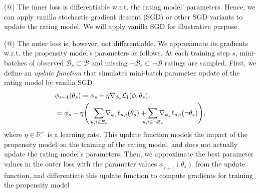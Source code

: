 \documentclass[letterpaper]{article} %
\makeatletter
\newcommand{\lrdense}[2]{\smashoperator[lr]{#1_{#2}}}
\newcommand{\rdense}[2]{\smashoperator[r]{#1_{#2}}}
\newcommand{\realNumber}{\mathbb{R}}
\newcommand{\obsBiasedPairs}{\mathcal{B}}
\newcommand{\misBiasedPairs}{{\lnot\mathcal{B}}}
\newcommand{\loss}[1]{\mathcal{L}_{\rm #1}}
\newcommand{\obsLoss}{\ell}
\newcommand{\misLoss}{\ell}
\newcommand{\innerMark}{I}
\newcommand{\ratingParam}{\phi}
\newcommand{\propensityParam}{\theta}
\newcommand{\step}{s}
\newcommand{\learningRate}{\eta}
\newcommand*{\myroman}[1]{\expandafter\@slowromancap\romannumeral #1@}
\makeatother
\begin{document}
(\myroman{1}) The inner loss is differentiable w.r.t. the rating model' parameters.
Hence, we can apply vanilla stochastic gradient descent (SGD) or other SGD variants to update the rating model.
We will apply vanilla SGD for illustrative purpose.

(\myroman{2}) The outer loss is, however, not differentiable. 
We approximate its gradients w.r.t. the propensity model's parameters as follows.
At each training step $\step$, mini-batches of observed $\obsBiasedPairs_\step\subset\obsBiasedPairs$ and missing $\misBiasedPairs_\step\subset\misBiasedPairs$ ratings are sampled.
First, we define an \emph{update function} that simulates mini-batch parameter update of the rating model by vanilla SGD
\begin{align}
&\ratingParam_{\step+1}(\propensityParam_\step)
=\ratingParam_\step-\learningRate\nabla_{\ratingParam_\step}
\loss{\innerMark}(\ratingParam,\propensityParam_\step),\nonumber\\%
&=\ratingParam_\step-\learningRate\Bigg(
  \rdense{\sum}{u,i\in\obsBiasedPairs_\step}\nabla_{\ratingParam_\step}
  \obsLoss_{u,i}(\propensityParam_\step)
  +\lrdense{\sum}{u,i\in\misBiasedPairs_\step}\nabla_{\ratingParam_\step}
  \misLoss_{u,i}(\lnot\propensityParam_\step)
\Bigg),\nonumber
\end{align}%
where $\learningRate\in\realNumber^+$ is a learning rate.
This update function models the impact of the propensity model on the training of the rating model, and does not actually update the rating model's parameters.
Then, we approximate the best parameter values in the outer loss with the parameter values $\ratingParam_{\step+1}(\propensityParam_\step)$ from the update function, and differentiate this update function to compute gradients for training the propensity model
\end{document}
